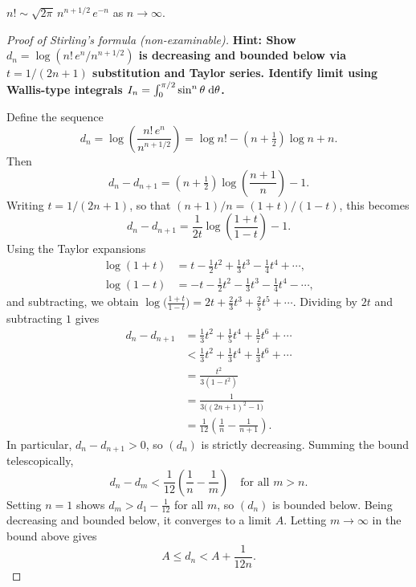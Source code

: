 \documentclass[a4paper]{article}
\begin{document}
\begin{cor}
  $n!\sim \sqrt{2\pi}\, n^{n + 1/2}\, e^{-n}$ as $n \to \infty$.
\end{cor}

\begin{proof}[Proof of Stirling's formula (non-examinable)]
  \textbf{Hint: Show $d_n = \log(n!\,e^n/n^{n+1/2})$ is decreasing and bounded below via $t = 1/(2n+1)$ substitution and Taylor series. Identify limit using Wallis-type integrals $I_n = \int_0^{\pi/2}\sin^n\theta\;\mathrm{d}\theta$.}

  Define the sequence
  \[
    d_n = \log \left(\frac{n!\,e^n}{n^{n + 1/2}}\right) = \log n! - \left(n + \tfrac{1}{2}\right)\log n + n.
  \]
  Then
  \[
    d_n - d_{n + 1} = \left(n + \tfrac{1}{2}\right)\log\left(\frac{n + 1}{n}\right) - 1.
  \]
  Writing $t = 1/(2n + 1)$, so that $(n+1)/n = (1+t)/(1-t)$, this becomes
  \[
    d_n - d_{n + 1} = \frac{1}{2t}\log\left(\frac{1 + t}{1 - t}\right) - 1.
  \]
  Using the Taylor expansions
  \begin{align*}
    \log (1 + t) &= t -\frac{1}{2}t^2 + \frac{1}{3}t^3 - \frac{1}{4}t^4 + \cdots,\\
    \log (1 - t) &= -t -\frac{1}{2}t^2 - \frac{1}{3}t^3 - \frac{1}{4}t^4 - \cdots,
  \end{align*}
  and subtracting, we obtain $\log\bigl(\frac{1+t}{1-t}\bigr) = 2t + \frac{2}{3}t^3 + \frac{2}{5}t^5 + \cdots$. Dividing by $2t$ and subtracting $1$ gives
  \begin{align*}
    d_n - d_{n + 1} &= \frac{1}{3}t^2 + \frac{1}{5}t^4 + \frac{1}{7}t^6 + \cdots\\
    &< \frac{1}{3}t^2 + \frac{1}{3}t^4 + \frac{1}{3}t^6 + \cdots\\
    &= \frac{t^2}{3(1 - t^2)}\\
    &= \frac{1}{3\bigl((2n + 1)^2 - 1\bigr)}\\
    &= \frac{1}{12}\left(\frac{1}{n} - \frac{1}{n + 1}\right).
  \end{align*}
  In particular, $d_n - d_{n+1} > 0$, so $(d_n)$ is strictly decreasing. Summing the bound telescopically,
  \[
    d_n - d_m < \frac{1}{12}\left(\frac{1}{n} - \frac{1}{m}\right) \quad \text{for all } m > n.
  \]
  Setting $n = 1$ shows $d_m > d_1 - \frac{1}{12}$ for all $m$, so $(d_n)$ is bounded below. Being decreasing and bounded below, it converges to a limit $A$. Letting $m \to \infty$ in the bound above gives
  \[
    A \leq d_n < A + \frac{1}{12n}.
  \]


\end{proof}
\end{document}
